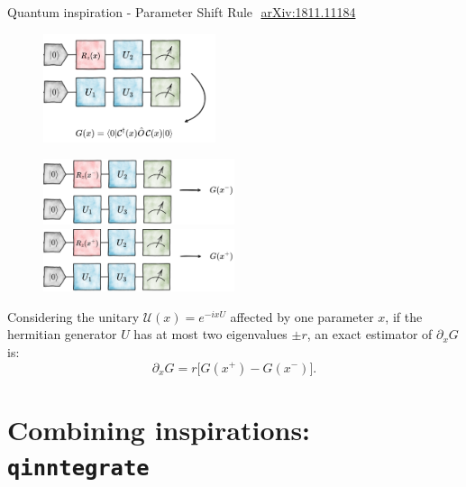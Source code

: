 \documentclass[8pt, xcolor={svgnames}, hyperref={linkcolor=black}]{beamer}
\begin{document}
\begin{frame}{Quantum inspiration - Parameter Shift Rule \hfill \faBook\,\,\href{https://arxiv.org/abs/1811.11184}{arXiv:1811.11184}}
\begin{multicols}{2}
\begin{figure}
    \includegraphics[width=0.45\textwidth]{figures/start.png}
\end{figure}
\pause
\begin{figure}  
    \includegraphics[width=0.5\textwidth]{figures/backward.png}
    \includegraphics[width=0.5\textwidth]{figures/forward.png}
\end{figure}
\end{multicols}

Considering the unitary $\mathcal{U}(x)=e^{-ix U}$ affected by one 
parameter $x$, if the hermitian generator $U$ has at most two eigenvalues $\pm r$,
an exact estimator of $\partial_{x}G$ is:
$$ \partial_x G = r \bigl[ G(x^+) - G(x^-) \bigr]. $$
\end{frame}

\section{Combining inspirations: \texttt{qinntegrate}}
\end{document}

